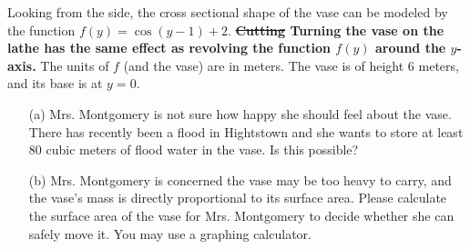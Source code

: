 \documentclass{article}
\begin{document}
Looking from the side, the cross sectional shape of the vase can be modeled by the function $f(y)=\cos(y-1)+2$. \textbf{\st{Cutting} Turning the vase on the lathe has the same effect as revolving the function $f(y)$ around the $y$-axis.} The units of $f$ (and the vase) are in meters. The vase is of height $6$ meters, and its base is at $y=0$. 


\begin{itemize}
	\item[(a)] Mrs. Montgomery is not sure how happy she should feel about the vase. There has recently been a flood in Hightstown and she wants to store at least $80$ cubic meters of flood water in the vase. Is this possible?


	\item[(b)] Mrs. Montgomery is concerned the vase may be too heavy to carry, and the vase's mass is directly proportional to its surface area. Please calculate the surface area of the vase for Mrs. Montgomery to decide whether she can safely move it. You may use a graphing calculator.
\end{itemize}

\newpage
\end{document}
